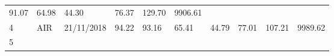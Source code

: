 \documentclass[
  11pt,
]{article}
\begin{document}
\begin{longtable}[]{@{}llllllllll@{}}
\begin{minipage}[t]{0.06\columnwidth}
91.07\strut
\end{minipage} & \begin{minipage}[t]{0.06\columnwidth}\raggedright
64.98\strut
\end{minipage} & \begin{minipage}[t]{0.06\columnwidth}\raggedright
44.30\strut
\end{minipage} & \begin{minipage}[t]{0.06\columnwidth}\raggedright
76.37\strut
\end{minipage} & \begin{minipage}[t]{0.13\columnwidth}\raggedright
129.70\strut
\end{minipage} & \begin{minipage}[t]{0.08\columnwidth}\raggedright
9906.61\strut
\end{minipage}\tabularnewline
\begin{minipage}[t]{0.04\columnwidth}\raggedright
4\strut
\end{minipage} & \begin{minipage}[t]{0.09\columnwidth}\raggedright
AIR\strut
\end{minipage} & \begin{minipage}[t]{0.10\columnwidth}\raggedright
21/11/2018\strut
\end{minipage} & \begin{minipage}[t]{0.06\columnwidth}\raggedright
94.22\strut
\end{minipage} & \begin{minipage}[t]{0.06\columnwidth}\raggedright
93.16\strut
\end{minipage} & \begin{minipage}[t]{0.06\columnwidth}\raggedright
65.41\strut
\end{minipage} & \begin{minipage}[t]{0.06\columnwidth}\raggedright
44.79\strut
\end{minipage} & \begin{minipage}[t]{0.06\columnwidth}\raggedright
77.01\strut
\end{minipage} & \begin{minipage}[t]{0.13\columnwidth}\raggedright
107.21\strut
\end{minipage} & \begin{minipage}[t]{0.08\columnwidth}\raggedright
9989.62\strut
\end{minipage}\tabularnewline
\begin{minipage}[t]{0.04\columnwidth}\raggedright
5\strut
\end{minipage} & \begin{minipage}[t]{0.09\columnwidth}\raggedright

\end{minipage}
\end{longtable}
\end{document}
